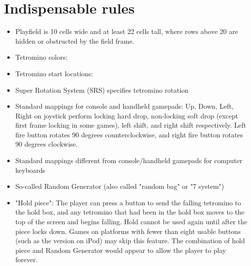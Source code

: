 \documentclass[a4paper]{article}
\begin{document}
\section{Indispensable rules}
\label{rules}

\begin{itemize}
	\item Playfield is 10 cells wide and at least 22 cells tall, where rows above 20 are hidden or obstructed by the field frame.
	\item Tetromino colors:
		
	
	\item Tetromino start locations:
		

\item Super Rotation System (SRS) specifies tetromino rotation

\item Standard mappings for console and handheld gamepads:
Up, Down, Left, Right on joystick perform locking hard drop, non-locking soft drop (except first frame locking in some games), left shift, and right shift respectively.
Left fire button rotates 90 degrees counterclockwise, and right fire button rotates 90 degrees clockwise.

\item Standard mappings different from console/handheld gamepads for computer keyboards

\item So-called Random Generator (also called "random bag" or "7 system")

\item "Hold piece": The player can press a button to send the falling tetromino to the hold box, and any tetromino that had been in the hold box moves to the top of the screen and begins falling. Hold cannot be used again until after the piece locks down. Games on platforms with fewer than eight usable buttons (such as the version on iPod) may skip this feature. The combination of hold piece and Random Generator would appear to allow the player to play forever.


\end{itemize}
\end{document}
